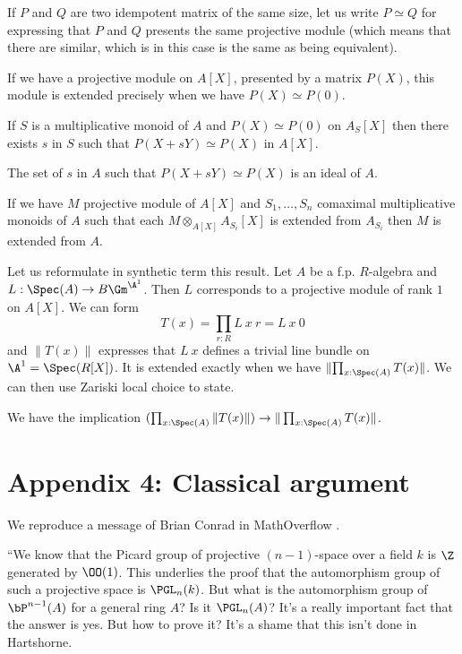 If $P$ and $Q$ are two idempotent matrix of the same size, let us write $P\simeq Q$ for expressing that $P$ and $Q$ presents
the same projective module (which means that there are similar, which is in this case is the same as being equivalent).

If we have a projective module on $A[X]$, presented by a matrix $P(X)$, this module is extended
precisely when we have $P(X)\simeq P(0)$.

\begin{lemma}
  If $S$ is a multiplicative monoid of $A$ and $P(X)\simeq P(0)$ on $A_S[X]$ then there exists
  $s$ in $S$ such that $P(X+sY)\simeq P(X)$ in $A[X]$.
\end{lemma}

\begin{lemma}
  The set of $s$ in $A$ such that $P(X+sY)\simeq P(X)$ is an ideal of $A$.
\end{lemma}

\begin{corollary}
  If we have $M$ projective module of $A[X]$ and $S_1,\dots,S_n$ comaximal multiplicative monoids of $A$
  such that each $M\otimes_{A[X]} A_{S_i}[X]$ is extended from $A_{S_i}$ then $M$ is extended from $A$.
\end{corollary}

Let us reformulate in synthetic term this result. Let $A$ be a f.p. $R$-algebra and $L:\Spec(A)\rightarrow B\Gm^{\A^1}$.
Then $L$ corresponds to a projective module of rank $1$ on $A[X]$. We can form
$$T(x) = \prod_{r:R}L~x~r = L~x~0$$
and $\|T(x)\|$ expresses that $L~x$ defines a trivial line bundle on $\A^1 = \Spec(R[X])$.
It is extended exactly when we have
$\|{\prod_{x:\Spec(A)}T(x)}\|$. We can then use Zariski local choice to state.

\begin{proposition}\label{c2}
  We have the implication $(\prod_{x:\Spec(A)}\|T(x)\|)\rightarrow \|\prod_{x:\Spec(A)}T(x)\|$.
\end{proposition}

\newpage

\section*{Appendix 4: Classical argument}

We reproduce a message of Brian Conrad in MathOverflow \cite{conrad-mathoverflow-16324}.

\medskip

``We know that the Picard group of projective $(n-1)$-space over a field $k$ is $\Z$
generated by $\OO(1)$.
This underlies the proof that the automorphism group of such a projective space is $\PGL_n(k)$.
But what is the automorphism group of $\bP^{n-1}(A)$ for a general ring $A$? Is it $\PGL_n(A)$?
It's a really important fact that the answer is yes.
But how to prove it? It's a shame that this isn't done in Hartshorne.

